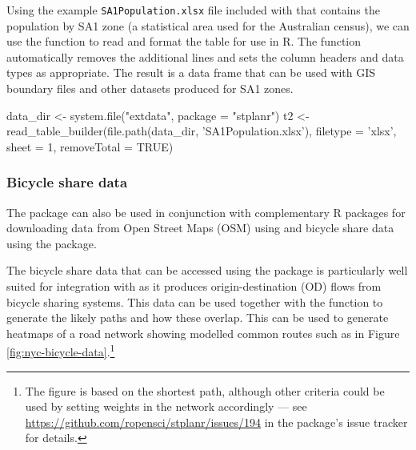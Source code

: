 Using the example \texttt{SA1Population.xlsx} file included with  that contains the population by SA1 zone (a statistical area used for the Australian census), we can use the  function to read and format the table for use in R.
The function automatically removes the additional lines and sets the column headers and data types as appropriate.
The result is a data frame that can be used with GIS boundary files and other datasets produced for SA1 zones.

\begin{Schunk}
\begin{Sinput}
data_dir <- system.file("extdata", package = "stplanr")
t2 <- read_table_builder(file.path(data_dir, 'SA1Population.xlsx'),
                         filetype = 'xlsx', sheet = 1, removeTotal = TRUE)
\end{Sinput}
\end{Schunk}

\subsubsection{Bicycle share data} \label{bicycle-share-data}
The  package can also be used in conjunction with complementary R packages for downloading data from Open Street Maps (OSM) using  and bicycle share data using the  package.

The bicycle share data that can be accessed using the  package is particularly well suited for integration with  as it produces origin-destination (OD) flows from bicycle sharing systems.
This data can be used together with the  function to generate the likely paths and how these overlap.
This can be used to generate heatmaps of a road network showing modelled common routes such as in Figure
\ref{fig:nyc-bicycle-data}.\footnote{The
figure is based on the shortest path, although other criteria could be used by setting weights in the network accordingly --- see \url{https://github.com/ropensci/stplanr/issues/194} in the package's issue tracker for
details.}

